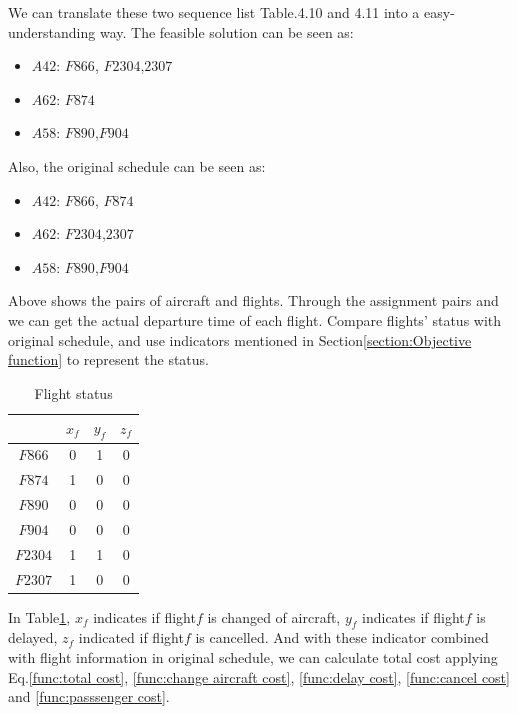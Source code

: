 \documentclass[senior]{IPSstyle}
\begin{document}
We can translate these two sequence list Table.4.10 and 4.11 into a easy-understanding way.
The feasible solution can be seen as:
\begin{itemize}
    \item \(A42\):  \(F866\), \(F2304\),\(2307\)
    \item \(A62\): \(F874\)
    \item \(A58\): \(F890\),\(F904\)
\end{itemize}
Also, the original schedule can be seen as:
\begin{itemize}
    \item \(A42\):  \(F866\), \(F874\)
    \item \(A62\): \(F2304\),\(2307\)
    \item \(A58\): \(F890\),\(F904\)
\end{itemize}
Above shows the pairs of aircraft and flights. Through the assignment pairs and we can get the actual departure time of each flight. Compare flights' status with original schedule, and use indicators mentioned in Section\ref{section:Objective function} to represent the status.
\begin{table}[h]
\renewcommand{\arraystretch}{1}
\begin{center}
\begin{tabular}{|c|c|c|c|}
\hline
\multicolumn{1}{|c|}{}
&\multicolumn{1}{c|}{\(x_f\)}
&\multicolumn{1}{c|}{\(y_f\)}
&\multicolumn{1}{c|}{\(z_f\)}
\\	\hline
\(F866\)  & 0 & 1 & 0
\\	\hline
\(F874\) & 1 & 0 & 0
\\	\hline
\(F890\) & 0 & 0 & 0 
\\  \hline
\(F904\) & 0 & 0 & 0
\\  \hline
\(F2304\) & 1 & 1 & 0
\\  \hline
\(F2307\) & 1 & 0 & 0
\\  \hline
\end{tabular}
\caption{Flight status}
\label{table:Flight status}
\end{center}
\end{table}

In Table\ref{table:Flight status}, \(x_f\) indicates if flight\(f\) is changed of aircraft, \(y_f\) indicates if flight\(f\) is delayed, \(z_f\) indicated if flight\(f\) is cancelled. And with these indicator combined with flight information in original schedule, we can calculate total cost applying Eq.\ref{func:total cost}, \ref{func:change aircraft cost}, \ref{func:delay cost}, \ref{func:cancel cost} and \ref{func:passsenger cost}.
\end{document}
